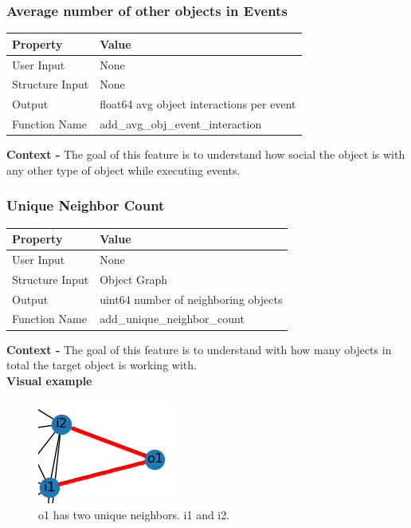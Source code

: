 \documentclass{article}
\begin{document}
\subsubsection{Average number of other objects in Events} 
\begin{center}
	\begin{tabular}{| p{3cm} p{7cm} |}
		\hline
		\textbf{Property} & \textbf{Value}\\
		\hline
		User Input & None\\
		Structure Input & None\\
		Output & float64 avg object interactions per event\\
		Function Name & add\_avg\_obj\_event\_interaction\\
		\hline
	\end{tabular}
\end{center}

\textbf{Context -} The goal of this feature is to understand how social the object is with any other type of object while executing events. 
\\
\subsubsection{Unique Neighbor Count}
\begin{center}
	\begin{tabular}{| p{3cm} p{7cm} |}
		\hline
		\textbf{Property} & \textbf{Value}\\
		\hline
		User Input & None\\
		Structure Input & Object Graph\\
		Output & uint64 number of neighboring objects\\
		Function Name & add\_unique\_neighbor\_count\\
		\hline
	\end{tabular}
\end{center}

\textbf{Context -} The goal of this feature is to understand with how many objects in total the target object is working with.
\\

\textbf{Visual example}
\begin{figure}[h]
	\centering
	\includegraphics[scale=0.5]{images/obj-unc.png}
	\caption{o1 has two unique neighbors. i1 and i2.}
	\label{fig:obj-unc}
\end{figure}
\end{document}

